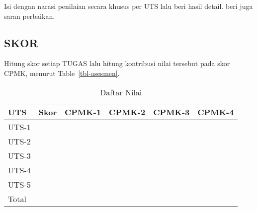 \documentclass[
  letterpaper,
  DIV=11,
  numbers=noendperiod]{scrreprt}
\begin{document}
Isi dengan narasi penilaian secara khusus per UTS lalu beri hasil
detail. beri juga saran perbaikan.

\subsection{SKOR}\label{skor}

Hitung skor setiap TUGAS lalu hitung kontribusi nilai tersebut pada skor
CPMK, menurut Table~\ref{tbl-asesmen}.

\begin{longtable}[]{@{}llllll@{}}

\caption{\label{tbl-skor-akhir}Daftar Nilai}

\tabularnewline

\toprule\noalign{}
UTS & Skor & CPMK-1 & CPMK-2 & CPMK-3 & CPMK-4 \\
\midrule\noalign{}
\endhead
\bottomrule\noalign{}
\endlastfoot
UTS-1 & & & & & \\
UTS-2 & & & & & \\
UTS-3 & & & & & \\
UTS-4 & & & & & \\
UTS-5 & & & & & \\
Total & & & & & \\

\end{longtable}
\end{document}
